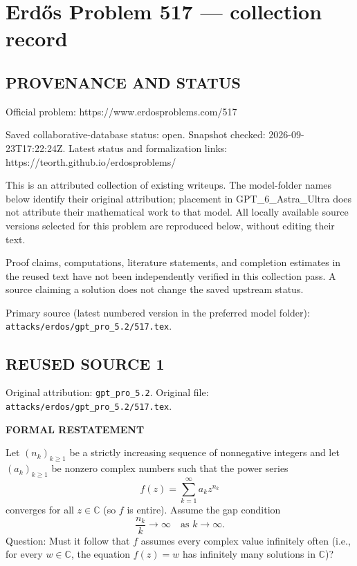 \section*{Erd\H{o}s Problem 517 --- collection record}

\subsection*{PROVENANCE AND STATUS}
Official problem: https://www.erdosproblems.com/517

Saved collaborative-database status: open.
Snapshot checked: 2026-09-23T17:22:24Z.
Latest status and formalization links: https://teorth.github.io/erdosproblems/

This is an attributed collection of existing writeups. The model-folder names below identify their original attribution; placement in GPT\_6\_Astra\_Ultra does not attribute their mathematical work to that model. All locally available source versions selected for this problem are reproduced below, without editing their text.

Proof claims, computations, literature statements, and completion estimates in the reused text have not been independently verified in this collection pass. A source claiming a solution does not change the saved upstream status.

Primary source (latest numbered version in the preferred model folder): \texttt{attacks/erdos/gpt\_pro\_5.2/517.tex}.

\subsection*{REUSED SOURCE 1}
Original attribution: \texttt{gpt\_pro\_5.2}.
Original file: \texttt{attacks/erdos/gpt\_pro\_5.2/517.tex}.

\noindent\textbf{FORMAL RESTATEMENT}

Let $(n_k)_{k\ge 1}$ be a strictly increasing sequence of nonnegative integers and let $(a_k)_{k\ge 1}$ be nonzero complex numbers such that the power series
\[
f(z)=\sum_{k=1}^{\infty} a_k z^{n_k}
\]
converges for all $z\in\mathbb{C}$ (so $f$ is entire). Assume the gap condition
\[
\frac{n_k}{k}\to\infty\quad\text{as }k\to\infty.
\]
Question: Must it follow that $f$ assumes every complex value infinitely often (i.e., for every $w\in\mathbb{C}$, the equation $f(z)=w$ has infinitely many solutions in $\mathbb{C}$)?

